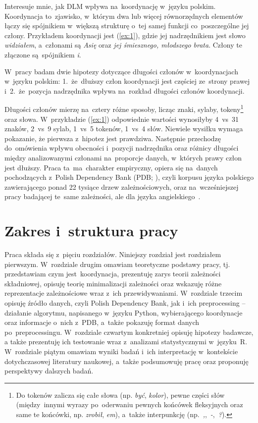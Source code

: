 \documentclass[licencjacka]{pracamgr_Kogni}
\begin{document}
    Interesuje mnie, jak DLM wpływa na~koordynację w~języku polskim.
    Koordynacja to~zjawisko, w~którym dwa lub więcej równorzędnych elementów łączy się spójnikiem w~większą strukturę o~tej samej funkcji co~poszczególne jej człony.
    Przykładem koordynacji jest (\ref{ex:1}), gdzie jej nadrzędnikiem jest słowo \textit{widziałem}, a~członami są \textit{Asię} oraz \textit{jej śmiesznego, młodszego brata}.
    Człony te złączone są~spójnikiem \textit{i}.

    W~pracy badam dwie hipotezy dotyczące długości członów w~koordynacjach w~języku polskim: 1.~że~dłuższy człon koordynacji jest częściej ze~strony prawej i~2.~że~pozycja nadrzędnika wpływa na~rozkład długości członów koordynacji.

    Długości członów mierzę na~cztery różne sposoby, licząc znaki, sylaby, tokeny\footnote{Do tokenów zalicza się całe słowa (np. \textit{być}, \textit{kolor}), pewne części słów (między~innymi wyrazy po~oderwaniu pewnych końcówek fleksyjnych oraz same te końcówki, np. \textit{zrobił}, \textit{em}), a~także interpunkcję (np.~\textit{,},~\textit{-},~\textit{?}).} oraz słowa.
    W~przykładzie (\ref{ex:1}) odpowiednie wartości wynosiłyby 4~vs~31 znaków, 2~vs~9 sylab, 1~vs~5 tokenów, 1~vs~4 słów.
    Niewiele wysiłku wymaga pokazanie, że pierwsza z~hipotez jest prawdziwa.
    Następnie przechodzę do~omówienia wpływu obecności i~pozycji nadrzędnika oraz różnicy długości między analizowanymi członami na~proporcje danych, w~których prawy człon jest dłuższy.
    Praca ta~ma~charakter empiryczny, opiera się na~danych pochodzących z~Polish Dependency Bank (PDB; \citealp{Wroblewska2014}), czyli korpusu języka polskiego zawierającego ponad 22 tysiące drzew zależnościowych, oraz na~wcześniejszej pracy badającej te~same zależności, ale dla języka angielskiego~\citep{Przepiorkowski2023}.


    \section{Zakres i~struktura pracy}\label{sec:zakres-istruktura-pracy}
    Praca składa się z~pięciu rozdziałów. 
    Niniejszy rozdział jest rozdziałem pierwszym.
    W~rozdziale drugim omawiam teoretyczne podstawy pracy, tj. przedstawiam czym jest~koordynacja, prezentuję zarys teorii zależności składniowej, opisuję teorię minimalizacji zależności oraz wskazuję różne reprezentacje zależnościowe wraz z~ich przewidywaniami.
    W~rozdziale trzecim opisuję źródło danych, czyli Polish Dependency Bank, jak i~ich preprocessing -- działanie algorytmu, napisanego w~języku Python, wybierającego koordynacje oraz informacje o~nich z~PDB, a~także pokazuję format danych po~preprocessingu.
    W~rozdziale czwartym konkretniej opisuję hipotezy badawcze, a także prezentuję ich testowanie wraz z~analizami statystycznymi w~języku~R. W~rozdziale piątym omawiam wyniki badań i~ich interpretację w~kontekście dotychczasowej literatury naukowej, a~także podsumowuję pracę oraz proponuję perspektywy dalszych badań.
\end{document}
